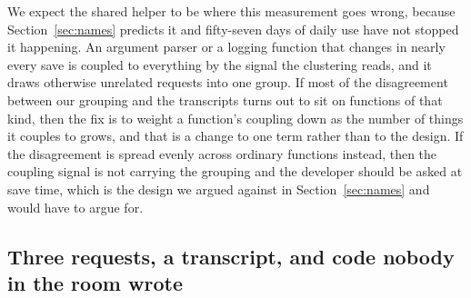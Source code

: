 We expect the shared helper to be where this measurement goes wrong, because
Section~\ref{sec:names} predicts it and fifty-seven days of daily use have not
stopped it happening. An argument parser or a logging function that changes in nearly every
save is coupled to everything by the signal the clustering reads, and it draws
otherwise unrelated requests into one group. If most of the disagreement between
our grouping and the transcripts turns out to sit on functions of that kind, then
the fix is to weight a function's coupling down as the number of things it couples
to grows, and that is a change to one term rather than to the design. If the
disagreement is spread evenly across ordinary functions instead, then the coupling
signal is not carrying the grouping and the developer should be asked at save
time, which is the design we argued against in Section~\ref{sec:names} and would
have to argue for.

\subsection{Three requests, a transcript, and code nobody in the room wrote}
\label{sec:eval-study}

